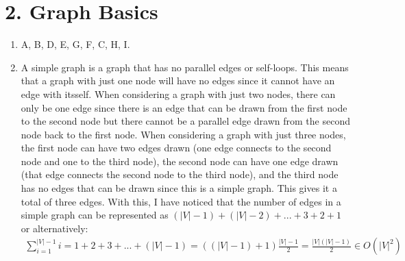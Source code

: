 \documentclass[11pt]{article}
\begin{document}
\section*{2. Graph Basics}
\begin{enumerate}[label=(\alph*)]
\item
A, B, D, E, G, F, C, H, I.
\vspace*{1\baselineskip}
\\

\item
A simple graph is a graph that has no parallel edges or self-loops. This means that a graph with just one node will have no edges since it cannot have an edge with itsself. When considering a graph with just two nodes, there can only be one edge since there is an edge that can be drawn from the first node to the second node but there cannot be a parallel edge drawn from the second node back to the first node. When considering a graph with just three nodes, the first node can have two edges drawn (one edge connects to the second node and one to the third node), the second node can have one edge drawn (that edge connects the second node to the third node), and the third node has no edges that can be drawn since this is a simple graph. This gives it a total of three edges. With this, I have noticed that the number of edges in a simple graph can be represented as $(|V| - 1) + (|V| - 2) + ... + 3 + 2 + 1$ or alternatively:
\begin{align*}
\sum\limits_{i = 1}^{|V| - 1} i = 1 + 2 + 3 + ... + (|V| - 1) = ((|V| - 1) + 1)\frac{|V| - 1} {2} = \frac{|V| (|V| - 1)} {2} \in O(|V|^2)
\end{align*}


\end{enumerate}
\end{document}
